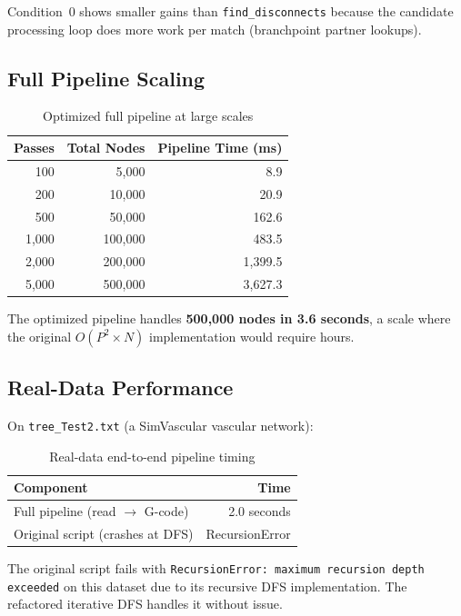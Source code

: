\documentclass[11pt,a4paper]{article}
\begin{document}
Condition~0 shows smaller gains than \texttt{find\_disconnects} because the candidate processing loop does more work per match (branchpoint partner lookups).

\subsection{Full Pipeline Scaling}

\begin{table}[H]
\centering
\caption{Optimized full pipeline at large scales}
\begin{tabular}{rrr}
\toprule
\textbf{Passes} & \textbf{Total Nodes} & \textbf{Pipeline Time (ms)} \\
\midrule
100 & 5,000 & 8.9 \\
200 & 10,000 & 20.9 \\
500 & 50,000 & 162.6 \\
1,000 & 100,000 & 483.5 \\
2,000 & 200,000 & 1,399.5 \\
5,000 & 500,000 & 3,627.3 \\
\bottomrule
\end{tabular}
\end{table}

The optimized pipeline handles \textbf{500,000 nodes in 3.6 seconds}, a scale where the original $O(P^2 \times N)$ implementation would require hours.

\subsection{Real-Data Performance}

On \texttt{tree\_Test2.txt} (a SimVascular vascular network):

\begin{table}[H]
\centering
\caption{Real-data end-to-end pipeline timing}
\begin{tabular}{lr}
\toprule
\textbf{Component} & \textbf{Time} \\
\midrule
Full pipeline (read $\rightarrow$ G-code) & 2.0 seconds \\
Original script (crashes at DFS) & RecursionError \\
\bottomrule
\end{tabular}
\end{table}

The original script fails with \texttt{RecursionError: maximum recursion depth exceeded} on this dataset due to its recursive DFS implementation. The refactored iterative DFS handles it without issue.
\end{document}
